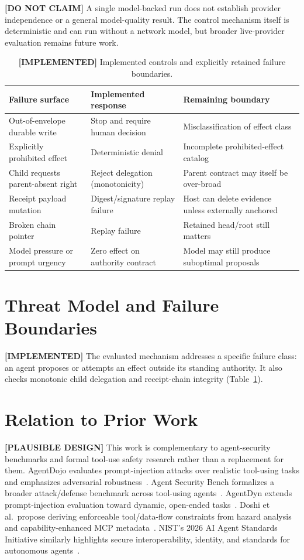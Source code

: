 \documentclass[10pt,twocolumn]{article}
\newcommand{\implemented}{\textbf{[IMPLEMENTED] }}
\newcommand{\plausibledesign}{\textbf{[PLAUSIBLE DESIGN] }}
\newcommand{\donotclaim}{\textbf{[DO NOT CLAIM] }}
\begin{document}
\donotclaim A single model-backed run does not establish provider independence or a general model-quality result. The control mechanism itself is deterministic and can run without a network model, but broader live-provider evaluation remains future work.

\begin{table}[t]
\centering
\small
\begin{tabular}{lll}
\toprule
\textbf{Failure surface} & \textbf{Implemented response} & \textbf{Remaining boundary} \\
\midrule
Out-of-envelope durable write & Stop and require human decision & Misclassification of effect class \\
Explicitly prohibited effect & Deterministic denial & Incomplete prohibited-effect catalog \\
Child requests parent-absent right & Reject delegation (monotonicity) & Parent contract may itself be over-broad \\
Receipt payload mutation & Digest/signature replay failure & Host can delete evidence unless externally anchored \\
Broken chain pointer & Replay failure & Retained head/root still matters \\
Model pressure or prompt urgency & Zero effect on authority contract & Model may still produce suboptimal proposals \\
\bottomrule
\end{tabular}
\caption{\implemented Implemented controls and explicitly retained failure boundaries.}
\label{tab:threat}
\end{table}

\section{Threat Model and Failure Boundaries}
\implemented The evaluated mechanism addresses a specific failure class: an agent proposes or attempts an effect outside its standing authority. It also checks monotonic child delegation and receipt-chain integrity (Table~\ref{tab:threat}).

\section{Relation to Prior Work}
\plausibledesign This work is complementary to agent-security benchmarks and formal tool-use safety research rather than a replacement for them. AgentDojo evaluates prompt-injection attacks over realistic tool-using tasks and emphasizes adversarial robustness~\cite{debenedetti2024agentdojo}. Agent Security Bench formalizes a broader attack/defense benchmark across tool-using agents~\cite{zhang2024asb}. AgentDyn extends prompt-injection evaluation toward dynamic, open-ended tasks~\cite{li2026agentdyn}. Doshi et al.\ propose deriving enforceable tool/data-flow constraints from hazard analysis and capability-enhanced MCP metadata~\cite{doshi2026verifiably}. NIST's 2026 AI Agent Standards Initiative similarly highlights secure interoperability, identity, and standards for autonomous agents~\cite{nist2026agentstandards}.
\end{document}
